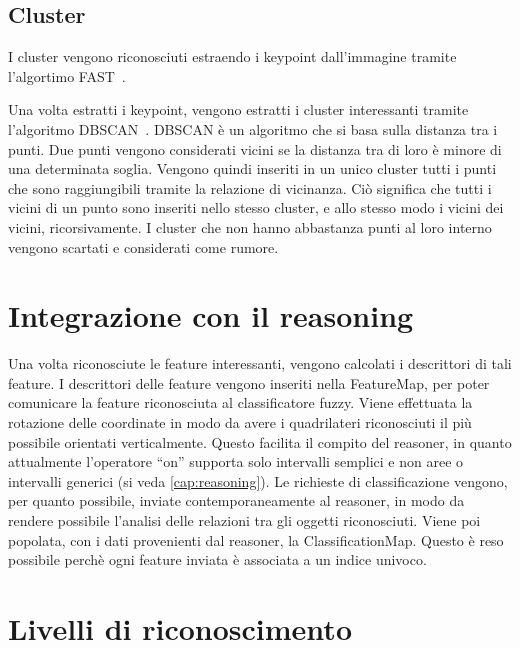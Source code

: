 \subsection{Cluster}

I cluster vengono riconosciuti estraendo i keypoint dall'immagine tramite l'algortimo FAST~\cite{rosten_2006_machine}.

Una volta estratti i keypoint, vengono estratti i cluster interessanti tramite l'algoritmo DBSCAN~\cite{ester1996density}.
DBSCAN è un algoritmo che si basa sulla distanza tra i punti. Due punti vengono considerati vicini se la distanza tra di loro è minore di una determinata soglia. Vengono quindi inseriti in un unico cluster tutti i punti che sono raggiungibili tramite la relazione di vicinanza. Ciò significa che tutti i vicini di un punto sono inseriti nello stesso cluster, e allo stesso modo i vicini dei vicini, ricorsivamente.
I cluster che non hanno abbastanza punti al loro interno vengono scartati e considerati come rumore.

\section{Integrazione con il reasoning}
Una volta riconosciute le feature interessanti, vengono calcolati i descrittori di tali feature. I descrittori delle feature vengono inseriti nella FeatureMap, per poter comunicare la feature riconosciuta al classificatore fuzzy.
Viene effettuata la rotazione delle coordinate in modo da avere i quadrilateri riconosciuti il più possibile orientati verticalmente. Questo facilita il compito del reasoner, in quanto attualmente l'operatore ``on'' supporta solo intervalli semplici e non aree o intervalli generici (si veda \autoref{cap:reasoning}).
Le richieste di classificazione vengono, per quanto possibile, inviate contemporaneamente al reasoner, in modo da rendere possibile l'analisi delle relazioni tra gli oggetti riconosciuti. Viene poi popolata, con i dati provenienti dal reasoner, la ClassificationMap. Questo è reso possibile perchè ogni feature inviata è associata a un indice univoco.


\section{Livelli di riconoscimento}



